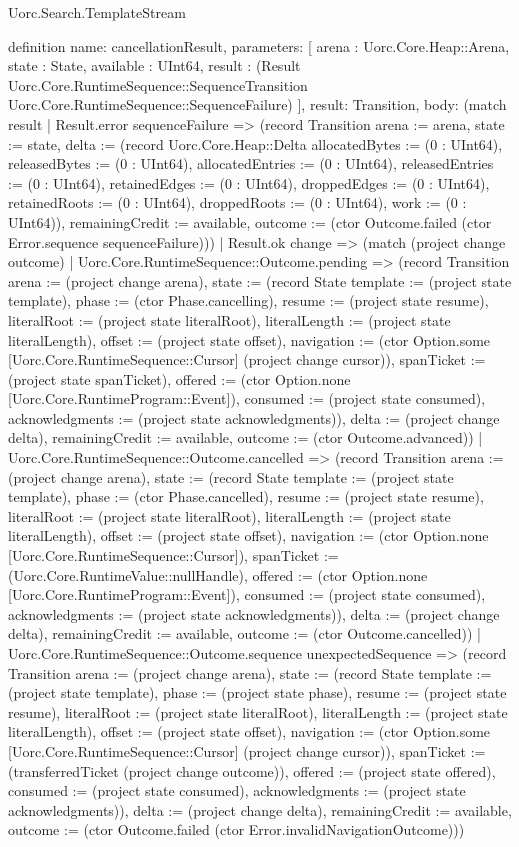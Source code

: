 \begin{lexlean}{Uorc.Search.TemplateStream}
\begin{semanticmodule}
definition{
  name: cancellationResult,
  parameters: [
    arena : Uorc.Core.Heap::Arena,
    state : State,
    available : UInt64,
    result : (Result Uorc.Core.RuntimeSequence::SequenceTransition Uorc.Core.RuntimeSequence::SequenceFailure)
  ],
  result: Transition,
  body: (match result
    | Result.error sequenceFailure => (record Transition {arena := arena, state := state, delta := (record Uorc.Core.Heap::Delta {allocatedBytes := (0 : UInt64), releasedBytes := (0 : UInt64), allocatedEntries := (0 : UInt64), releasedEntries := (0 : UInt64), retainedEdges := (0 : UInt64), droppedEdges := (0 : UInt64), retainedRoots := (0 : UInt64), droppedRoots := (0 : UInt64), work := (0 : UInt64)}), remainingCredit := available, outcome := (ctor Outcome.failed (ctor Error.sequence sequenceFailure))})
    | Result.ok change => (match (project change outcome)
      | Uorc.Core.RuntimeSequence::Outcome.pending => (record Transition {arena := (project change arena), state := (record State {template := (project state template), phase := (ctor Phase.cancelling), resume := (project state resume), literalRoot := (project state literalRoot), literalLength := (project state literalLength), offset := (project state offset), navigation := (ctor Option.some [Uorc.Core.RuntimeSequence::Cursor] (project change cursor)), spanTicket := (project state spanTicket), offered := (ctor Option.none [Uorc.Core.RuntimeProgram::Event]), consumed := (project state consumed), acknowledgments := (project state acknowledgments)}), delta := (project change delta), remainingCredit := available, outcome := (ctor Outcome.advanced)})
      | Uorc.Core.RuntimeSequence::Outcome.cancelled => (record Transition {arena := (project change arena), state := (record State {template := (project state template), phase := (ctor Phase.cancelled), resume := (project state resume), literalRoot := (project state literalRoot), literalLength := (project state literalLength), offset := (project state offset), navigation := (ctor Option.none [Uorc.Core.RuntimeSequence::Cursor]), spanTicket := (Uorc.Core.RuntimeValue::nullHandle), offered := (ctor Option.none [Uorc.Core.RuntimeProgram::Event]), consumed := (project state consumed), acknowledgments := (project state acknowledgments)}), delta := (project change delta), remainingCredit := available, outcome := (ctor Outcome.cancelled)})
      | Uorc.Core.RuntimeSequence::Outcome.sequence unexpectedSequence => (record Transition {arena := (project change arena), state := (record State {template := (project state template), phase := (project state phase), resume := (project state resume), literalRoot := (project state literalRoot), literalLength := (project state literalLength), offset := (project state offset), navigation := (ctor Option.some [Uorc.Core.RuntimeSequence::Cursor] (project change cursor)), spanTicket := (transferredTicket (project change outcome)), offered := (project state offered), consumed := (project state consumed), acknowledgments := (project state acknowledgments)}), delta := (project change delta), remainingCredit := available, outcome := (ctor Outcome.failed (ctor Error.invalidNavigationOutcome))})
}
\end{semanticmodule}
\end{lexlean}
